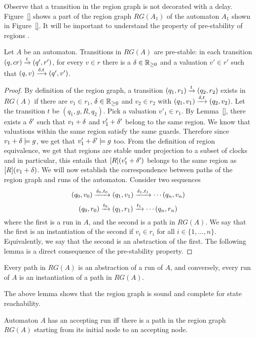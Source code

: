Observe that a transition in the region graph is not decorated with a delay. Figure~\ref{} shows a part of the region graph $RG(A_1)$ of the automaton $A_1$ shown in Figure~\ref{}. It will be important to understand the property of pre-stability of regions \cite{}.

\begin{lemma}
Let $A$ be an automaton. Transitions in $RG(A)$ are pre-stable: in each transition $(q,cr) \xrightarrow{t} (q', r')$, for every $v \in r$ there is a $\delta \in \mathbb{R}_{\ge 0}$ and a valuation $v' \in r'$ such that $(q, v) \xrightarrow{\delta, t} (q', v')$.
\end{lemma}

\begin{proof}
By definition of the region graph, a transition $(q_1, r_1) \xrightarrow{t} (q_2, r_2)$ exists in $RG(A)$ if there are $v_1 \in r_1$, $\delta \in \mathbb{R}_{\ge 0}$ and $v_2 \in r_2$ with $(q_1, v_1) \xrightarrow{\delta, t} (q_2, v_2)$. Let the transition $t$ be $(q_1, g, R, q_2)$. Pick a valuation $v'_1 \in r_1$. By Lemma~\ref{}, there exists a $\delta'$ such that $v_1 + \delta$ and $v'_1 + \delta'$ belong to the same region. We know that valuations within the same region satisfy the same guards. Therefore since $v_1 + \delta \models g$, we get that $v'_1 + \delta' \models g$ too. From the definition of region equivalence, we get that regions are stable under projection to a subset of clocks and in particular, this entails that $[R](v'_1 + \delta')$ belongs to the same region as $[R](v_1 + \delta)$. We will now establish the correspondence between paths of the region graph and runs of the automaton. Consider two sequences 
$$(q_0, v_0) \xrightarrow{\delta_0, t_0} (q_1, v_1) \xrightarrow{\delta_1, t_1} \cdots (q_n, v_n)$$
$$(q_0, r_0) \xrightarrow{t_0} (q_1, r_1) \xrightarrow{t_1} \cdots (q_n, r_n)$$
where the first is a run in $A$, and the second is a path in $RG(A)$. We say that the first is an instantiation of the second if $v_i \in r_i$ for all $i \in \{1, \dots, n\}$. Equivalently, we say that the second is an abstraction of the first. The following lemma is a direct consequence of the pre-stability property.
\end{proof}

\begin{lemma}
Every path in $RG(A)$ is an abstraction of a run of $A$, and conversely, every run of $A$ is an instantiation of a path in $RG(A)$.
\end{lemma}

The above lemma shows that the region graph is sound and complete for state reachability.

\begin{theorem}[\cite{}]
Automaton $A$ has an accepting run iﬀ there is a path in the region graph $RG(A)$ starting from its initial node to an accepting node.
\end{theorem}

